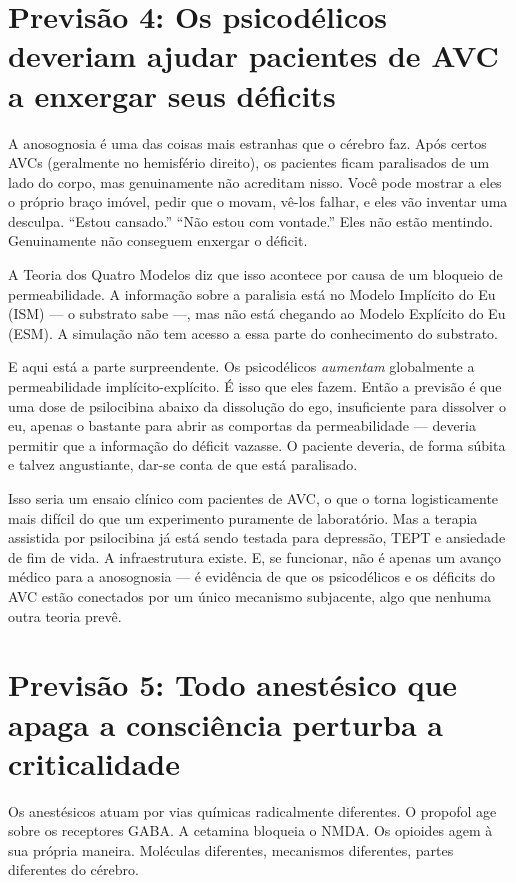 \documentclass[11pt, twoside, openright]{book}
\begin{document}
\section*{Previsão 4: Os psicodélicos deveriam ajudar pacientes de AVC a enxergar seus déficits}

A anosognosia é uma das coisas mais estranhas que o cérebro faz. Após certos AVCs (geralmente no hemisfério direito), os pacientes ficam paralisados de um lado do corpo, mas genuinamente não acreditam nisso. Você pode mostrar a eles o próprio braço imóvel, pedir que o movam, vê-los falhar, e eles vão inventar uma desculpa. ``Estou cansado.'' ``Não estou com vontade.'' Eles não estão mentindo. Genuinamente não conseguem enxergar o déficit.

A Teoria dos Quatro Modelos diz que isso acontece por causa de um bloqueio de permeabilidade. A informação sobre a paralisia está no Modelo Implícito do Eu (ISM) --- o substrato sabe ---, mas não está chegando ao Modelo Explícito do Eu (ESM). A simulação não tem acesso a essa parte do conhecimento do substrato.

E aqui está a parte surpreendente. Os psicodélicos \textit{aumentam} globalmente a permeabilidade implícito-explícito. É isso que eles fazem. Então a previsão é que uma dose de psilocibina abaixo da dissolução do ego, insuficiente para dissolver o eu, apenas o bastante para abrir as comportas da permeabilidade --- deveria permitir que a informação do déficit vazasse. O paciente deveria, de forma súbita e talvez angustiante, dar-se conta de que está paralisado.

Isso seria um ensaio clínico com pacientes de AVC, o que o torna logisticamente mais difícil do que um experimento puramente de laboratório. Mas a terapia assistida por psilocibina já está sendo testada para depressão, TEPT e ansiedade de fim de vida. A infraestrutura existe. E, se funcionar, não é apenas um avanço médico para a anosognosia --- é evidência de que os psicodélicos e os déficits do AVC estão conectados por um único mecanismo subjacente, algo que nenhuma outra teoria prevê.

\section*{Previsão 5: Todo anestésico que apaga a consciência perturba a criticalidade}

Os anestésicos atuam por vias químicas radicalmente diferentes. O propofol age sobre os receptores GABA. A cetamina bloqueia o NMDA. Os opioides agem à sua própria maneira. Moléculas diferentes, mecanismos diferentes, partes diferentes do cérebro.
\end{document}
